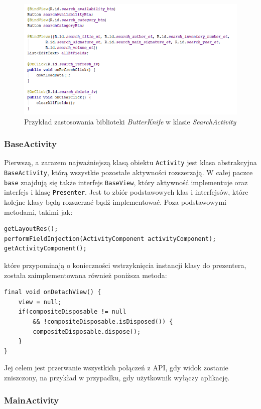 \documentclass[twoside]{projektInzynierskiMS}
\begin{document}
\begin{figure}[h]
  \centering
  \includegraphics[width=0.85\linewidth]{img/android/butterknife.png}
  \caption{Przykład zastosowania biblioteki \textit{ButterKnife} w klasie \textit{SearchActivity}}
  \label{fig:butterknife}
\end{figure}

\subsubsection{BaseActivity}

Pierwszą, a zarazem najważniejszą klasą obiektu \verb`Activity` jest klasa abstrakcyjna \verb`BaseActivity`, którą wszystkie pozostałe aktywności rozszerzają. W całej paczce \verb`base` znajdują się także interfejs \verb`BaseView`, który aktywność implementuje oraz interfejs i klasę \verb'Presenter'. Jest to zbiór podstawowych klas i interfejsów, które kolejne klasy będą rozszerzać bądź implementować. Poza podstawowymi metodami, takimi jak:
\begin{verbatim}
getLayoutRes();
performFieldInjection(ActivityComponent activityComponent);
getActivityComponent();
\end{verbatim} 
które przypominają o konieczności wstrzyknięcia instancji klasy do prezentera, została zaimplementowana również poniższa metoda:
\begin{verbatim} 
final void onDetachView() {
    view = null;
    if(compositeDisposable != null 
        && !compositeDisposable.isDisposed()) {
        compositeDisposable.dispose();
    }
}
\end{verbatim}

Jej celem jest przerwanie wszystkich połączeń z API, gdy widok zostanie zniszczony, na przykład w przypadku, gdy użytkownik wyłączy aplikację.

\subsubsection{MainActivity}
\end{document}
